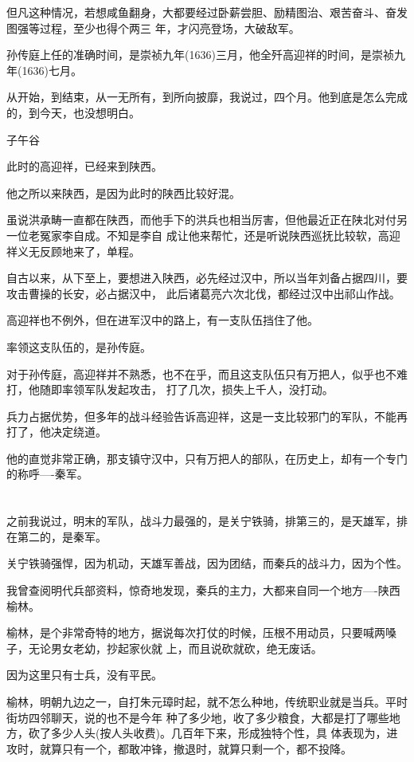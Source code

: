 \documentclass[11pt,a4paper,onecolumn]{article}
\begin{document}
但凡这种情况，若想咸鱼翻身，大都要经过卧薪尝胆、励精图治、艰苦奋斗、奋发图强等过程，至少也得个两三
年，才闪亮登场，大破敌军。

孙传庭上任的准确时间，是崇祯九年(1636)三月，他全歼高迎祥的时间，是崇祯九年(1636)七月。

从开始，到结束，从一无所有，到所向披靡，我说过，四个月。他到底是怎么完成的，到今天，也没想明白。

子午谷

此时的高迎祥，已经来到陕西。

他之所以来陕西，是因为此时的陕西比较好混。

虽说洪承畴一直都在陕西，而他手下的洪兵也相当厉害，但他最近正在陕北对付另一位老冤家李自成。不知是李自
成让他来帮忙，还是听说陕西巡抚比较软，高迎祥义无反顾地来了，单程。

自古以来，从下至上，要想进入陕西，必先经过汉中，所以当年刘备占据四川，要攻击曹操的长安，必占据汉中，
此后诸葛亮六次北伐，都经过汉中出祁山作战。

高迎祥也不例外，但在进军汉中的路上，有一支队伍挡住了他。

率领这支队伍的，是孙传庭。

对于孙传庭，高迎祥并不熟悉，也不在乎，而且这支队伍只有万把人，似乎也不难打，他随即率领军队发起攻击，
打了几次，损失上千人，没打动。

兵力占据优势，但多年的战斗经验告诉高迎祥，这是一支比较邪门的军队，不能再打了，他决定绕道。

他的直觉非常正确，那支镇守汉中，只有万把人的部队，在历史上，却有一个专门的称呼----秦军。

\section[\thesection]{}

之前我说过，明末的军队，战斗力最强的，是关宁铁骑，排第三的，是天雄军，排在第二的，是秦军。

关宁铁骑强悍，因为机动，天雄军善战，因为团结，而秦兵的战斗力，因为个性。

我曾查阅明代兵部资料，惊奇地发现，秦兵的主力，大都来自同一个地方----陕西榆林。

榆林，是个非常奇特的地方，据说每次打仗的时候，压根不用动员，只要喊两嗓子，无论男女老幼，抄起家伙就
上，而且说砍就砍，绝无废话。

因为这里只有士兵，没有平民。

榆林，明朝九边之一，自打朱元璋时起，就不怎么种地，传统职业就是当兵。平时街坊四邻聊天，说的也不是今年
种了多少地，收了多少粮食，大都是打了哪些地方，砍了多少人头(按人头收费)。几百年下来，形成独特个性，具
体表现为，进攻时，就算只有一个，都敢冲锋，撤退时，就算只剩一个，都不投降。
\end{document}
